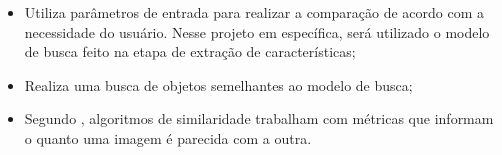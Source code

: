 \begin{itemize}
    \item<1> Utiliza parâmetros de entrada para realizar a comparação de acordo com a necessidade do usuário. Nesse projeto em específica, será utilizado o modelo de busca feito na etapa de extração de características;
    \item<1> Realiza uma busca de objetos semelhantes ao modelo de busca;
    \item<1> Segundo , algoritmos de similaridade trabalham com métricas que informam o quanto uma imagem é parecida com a outra.
\end{itemize}